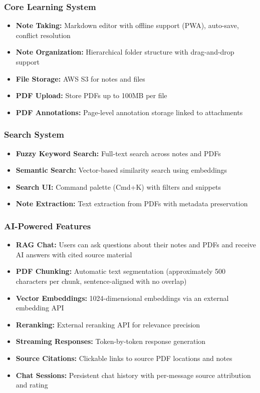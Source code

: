 \documentclass[12pt,a4paper]{article}
\begin{document}
\subsubsection{Core Learning System}

\begin{itemize}
    \item \textbf{Note Taking:} Markdown editor with offline support (PWA), auto-save, conflict resolution
    \item \textbf{Note Organization:} Hierarchical folder structure with drag-and-drop support
    \item \textbf{File Storage:} AWS S3 for notes and files
    \item \textbf{PDF Upload:} Store PDFs up to 100MB per file
    \item \textbf{PDF Annotations:} Page-level annotation storage linked to attachments
\end{itemize}

\subsubsection{Search System}

\begin{itemize}
    \item \textbf{Fuzzy Keyword Search:} Full-text search across notes and PDFs
    \item \textbf{Semantic Search:} Vector-based similarity search using embeddings
    \item \textbf{Search UI:} Command palette (Cmd+K) with filters and snippets
    \item \textbf{Note Extraction:} Text extraction from PDFs with metadata preservation
\end{itemize}

\subsubsection{AI-Powered Features}

\begin{itemize}
    \item \textbf{RAG Chat:} Users can ask questions about their notes and PDFs and receive AI answers with cited source material
    \item \textbf{PDF Chunking:} Automatic text segmentation (approximately 500 characters per chunk, sentence-aligned with no overlap)
    \item \textbf{Vector Embeddings:} 1024-dimensional embeddings via an external embedding API
    \item \textbf{Reranking:} External reranking API for relevance precision
    \item \textbf{Streaming Responses:} Token-by-token response generation
    \item \textbf{Source Citations:} Clickable links to source PDF locations and notes
    \item \textbf{Chat Sessions:} Persistent chat history with per-message source attribution and rating
\end{itemize}
\end{document}
